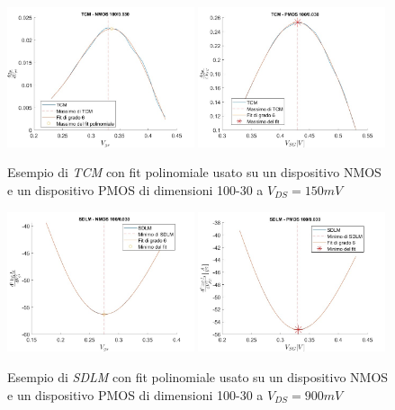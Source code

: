 \documentclass[12pt, letterpaper]{book}
\begin{document}
\begin{figure}[h!]
  \centering
  \includegraphics[width=0.49\textwidth]{TCM-N4-100-30}
  \includegraphics[width=0.49\textwidth]{TCM-P1-100-30}
  \caption{Esempio di \emph{TCM} con fit polinomiale usato su un dispositivo NMOS e un dispositivo PMOS di dimensioni 100-30 a $V_{DS} = 150 mV$}
  \includegraphics[width=0.49\textwidth]{SDLM-N4-100-30}
  \includegraphics[width=0.49\textwidth]{SDLM-P1-100-30}
  \caption{Esempio di \emph{SDLM} con fit polinomiale usato su un dispositivo NMOS e un dispositivo PMOS di dimensioni 100-30 a $V_{DS} = 900 mV$}
\end{figure}
\end{document}
